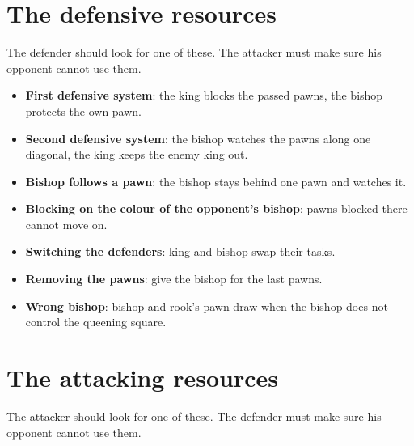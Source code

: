 \section*{The defensive resources}
The defender should look for one of these. The attacker must make sure his opponent cannot use them.

\begin{itemize}
\item \textbf{First defensive system}: the king blocks the passed pawns, the bishop protects the own pawn.

\item \textbf{Second defensive system}: the bishop watches the pawns along one diagonal, the king keeps the enemy king out.

\item \textbf{Bishop follows a pawn}: the bishop stays behind one pawn and watches it.

\item \textbf{Blocking on the colour of the opponent's bishop}: pawns blocked there cannot move on.

\item \textbf{Switching the defenders}: king and bishop swap their tasks.

\item \textbf{Removing the pawns}: give the bishop for the last pawns.

\item \textbf{Wrong bishop}: bishop and rook's pawn draw when the bishop does not control the queening square.
\end{itemize}

\section*{The attacking resources}
The attacker should look for one of these. The defender must make sure his opponent cannot use them.

